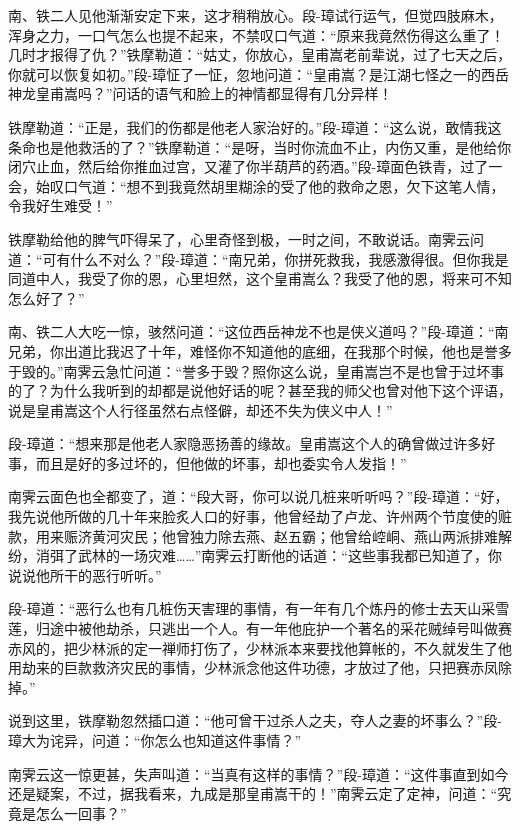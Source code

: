 \documentclass[12pt,oneside]{book}
\begin{document}
南、铁二人见他渐渐安定下来，这才稍稍放心。段-璋试行运气，但觉四肢麻木，浑身之力，一口气怎么也提不起来，不禁叹口气道：``原来我竟然伤得这么重了！几时才报得了仇？''铁摩勒道：``姑丈，你放心，皇甫嵩老前辈说，过了七天之后，你就可以恢复如初。''段-璋怔了一怔，忽地问道：``皇甫嵩？是江湖七怪之一的西岳神龙皇甫嵩吗？''问话的语气和脸上的神情都显得有几分异样！

铁摩勒道：``正是，我们的伤都是他老人家治好的。''段-璋道：``这么说，敢情我这条命也是他救活的了？''铁摩勒道：``是呀，当时你流血不止，内伤又重，是他给你闭穴止血，然后给你推血过宫，又灌了你半葫芦的药酒。''段-璋面色铁青，过了一会，始叹口气道：``想不到我竟然胡里糊涂的受了他的救命之恩，欠下这笔人情，令我好生难受！''

铁摩勒给他的脾气吓得呆了，心里奇怪到极，一时之间，不敢说话。南霁云问道：``可有什么不对么？''段-璋道：``南兄弟，你拼死救我，我感激得很。但你我是同道中人，我受了你的恩，心里坦然，这个皇甫嵩么？我受了他的恩，将来可不知怎么好了？''

南、铁二人大吃一惊，骇然问道：``这位西岳神龙不也是侠义道吗？''段-璋道：``南兄弟，你出道比我迟了十年，难怪你不知道他的底细，在我那个时候，他也是誉多于毁的。''南霁云急忙问道：``誉多于毁？照你这么说，皇甫嵩岂不是也曾于过坏事的了？为什么我听到的却都是说他好话的呢？甚至我的师父也曾对他下这个评语，说是皇甫嵩这个人行径虽然右点怪僻，却还不失为侠义中人！''

段-璋道：``想来那是他老人家隐恶扬善的缘故。皇甫嵩这个人的确曾做过许多好事，而且是好的多过坏的，但他做的坏事，却也委实令人发指！''

南霁云面色也全都变了，道：``段大哥，你可以说几桩来听听吗？''段-璋道：``好，我先说他所做的几十年来脸炙人口的好事，他曾经劫了卢龙、许州两个节度使的赃款，用来赈济黄河灾民；他曾独力除去燕、赵五霸；他曾给崆峒、燕山两派排难解纷，消弭了武林的一场灾难\ldots\ldots{}''南霁云打断他的话道：``这些事我都已知道了，你说说他所干的恶行听听。''

段-璋道：``恶行么也有几桩伤天害理的事情，有一年有几个炼丹的修士去天山采雪莲，归途中被他劫杀，只逃出一个人。有一年他庇护一个著名的采花贼绰号叫做赛赤风的，把少林派的定一禅师打伤了，少林派本来要找他算帐的，不久就发生了他用劫来的巨款救济灾民的事情，少林派念他这件功德，才放过了他，只把赛赤凤除掉。''

说到这里，铁摩勒忽然插口道：``他可曾干过杀人之夫，夺人之妻的坏事么？''段-璋大为诧异，问道：``你怎么也知道这件事情？''

南霁云这一惊更甚，失声叫道：``当真有这样的事情？''段-璋道：``这件事直到如今还是疑案，不过，据我看来，九成是那皇甫嵩干的！''南霁云定了定神，问道：``究竟是怎么一回事？''
\end{document}

